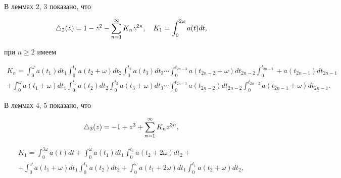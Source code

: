 В леммах 2, 3 показано, что


\begin{equation}


\tri_2(z)=1-z^2-\sum_{n=1}^\infty K_nz^{2n},


\quad K_1=\int_0^{2\omega}a(t)dt,


\end{equation}


при $n\ge2$ имеем


\begin{multline*}


K_n=


\int_0^{\omega}a(t_1)dt_1


\int_0^{t_1}a(t_2+\omega)dt_2\int_0^{t_2}a(t_3)dt_3\dotsb


\int_0^{t_{2n-3}}a(t_{2n-2}+\omega)dt_{2n-2}\int_0^{t_{2n-2}}+


a(t_{2n-1})dt_{2n-1}\\


%


+\int_0^{\omega}a(t_1+\omega)dt_1


\int_0^{t_1}a(t_2)dt_2\int_0^{t_2}a(t_3+\omega)dt_3\dotsb


\int_0^{t_{2n-3}}a(t_{2n-2})dt_{2n-2}\int_0^{t_{2n-2}}a(t_{2n-1}+


\omega)dt_{2n-1}.


\end{multline*}





В леммах 4, 5 показано, что


\begin{equation}


\tri_3(z)=-1+z^3+\sum_{n=1}^\infty K_nz^{3n},


\end{equation}


\begin{multline*}


K_1=\int_0^{3\omega}a(t)dt+


\int_0^{\omega}a(t_1)dt_1


\int_0^{t_1}a(t_2+2\omega)dt_2+\\


%


+\int_0^{\omega}a(t_1+\omega)dt_1


\int_0^{t_1}a(t_2)dt_2+


\int_0^{\omega}a(t_1+2\omega)dt_1


\int_0^{t_1}a(t_2+\omega)dt_2,


\end{multline*}


